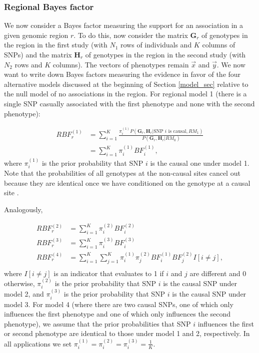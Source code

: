 \documentclass[11pt,titlepage]{article}
\begin{document}
\subsubsection{Regional Bayes factor}
We now consider a Bayes factor measuring the support for an association in a given genomic region $r$. To do this, now consider the matrix $\mathbf{G}_r$ of genotypes in the region in the first study (with $N_1$ rows of individuals and $K$ columns of SNPs) and the matrix $\mathbf{H}_r$ of genotypes in the region in the second study (with $N_2$ rows and $K$ columns). The vectors of phenotypes remain $\vec x$ and $\vec y$. We now want to write down Bayes factors measuring the evidence in favor of the four alternative models discussed at the beginning of Section \ref{model_sec} relative to the null model of no associations in the region. For regional model 1 (there is a single SNP casually associated with the first phenotype and none with the second phenotype):

\begin{align}
RBF_r^{(1)} &= \sum \limits_{i = 1}^{K} \frac{\pi_i^{(1)} P( \mathbf{G}_r, \mathbf{H}_r| \text{SNP $i$ is causal}, RM_1)}{P( \mathbf{G}_r, \mathbf{H}_r| RM_0)} \\
&= \sum \limits_{i = 1}^{K} \pi_i^{(1)} BF_i^{(1)},
\end{align} 
\noindent where $\pi_i^{(1)}$ is the prior probability that SNP $i$ is the causal one under model 1. Note that the probabilities of all genotypes at the non-causal sites cancel out because they are identical once we have conditioned on the genotype at a causal site \citep{maller2012bayesian}. 

Analogously, 

\begin{align}
RBF_r^{(2)}  &= \sum \limits_{i = 1}^{K} \pi_i^{(2)} BF_i^{(2)} \\
RBF_r^{(3)}  &= \sum \limits_{i = 1}^{K} \pi_i^{(3)} BF_i^{(3)} \\
RBF_r^{(4)}  &= \sum \limits_{i = 1}^{K} \sum \limits_{j = 1}^K \pi_i^{(1)} \pi_j^{(2)}  BF_i^{(1)} BF_j^{(2)} I[i \ne j ],\\
\end{align} 
\noindent where $I[i \ne j]$ is an indicator that evaluates to 1 if $i$ and $j$ are different and 0 otherwise, $\pi_i^{(2)}$ is the prior probability that SNP $i$ is the causal SNP under model 2, and $\pi_i^{(3)}$ is the prior probability that SNP $i$ is the causal SNP under model 3. For model 4 (where there are two causal SNPs, one of which only influences the first phenotype and one of which only influences the second phenotype), we assume that the prior probabilities that SNP $i$ influences the first or second phenotype are identical to those under model 1 and 2, respectively. In all applications we set $\pi_i^{(1)} = \pi_i^{(2)} = \pi_i^{(3)} = \frac{1}{K}$.
 
\end{document}

